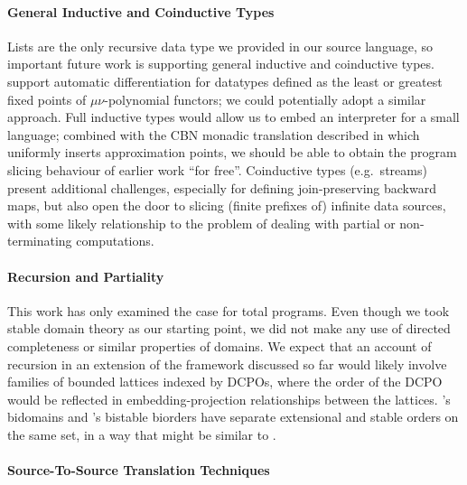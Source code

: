 
\paragraph{General Inductive and Coinductive Types}

Lists are the only recursive data type we provided in our source language, so important future work is
supporting general inductive and coinductive types. \citet{nunes2023} support automatic differentiation for
datatypes defined as the least or greatest fixed points of $\mu\nu$-polynomial functors; we could potentially
adopt a similar approach. Full inductive types would allow us to embed an interpreter for a small language;
combined with the CBN monadic translation described in  which uniformly inserts
approximation points, we should be able to obtain the program slicing behaviour of earlier \GPS work ``for
free''. Coinductive types (e.g.~streams) present additional challenges, especially for defining
join-preserving backward maps, but also open the door to slicing (finite prefixes of) infinite data sources,
with some likely relationship to the problem of dealing with partial or non-terminating computations.

\paragraph{Recursion and Partiality} This work has only examined the case for total programs. Even though we
took stable domain theory as our starting point, we did not make any use of directed completeness or similar
properties of domains. We expect that an account of recursion in an extension of the framework discussed so
far would likely involve families of bounded lattices indexed by DCPOs, where the order of the DCPO would be
reflected in embedding-projection relationships between the lattices. \citet{berry79}'s bidomains and
\citet{laird07}'s bistable biorders have separate extensional and stable orders on the same set, in a way that
might be similar to .

\paragraph{Source-To-Source Translation Techniques}

